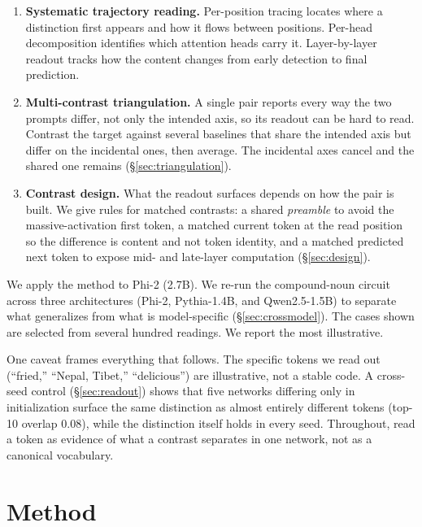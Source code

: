 \documentclass[11pt]{article}
\begin{document}
\begin{enumerate}[leftmargin=*]
\item \textbf{Systematic trajectory reading.} Per-position tracing locates where a
   distinction first appears and how it flows between positions. Per-head
   decomposition identifies which attention heads carry it. Layer-by-layer
   readout tracks how the content changes from early detection to final
   prediction.

\item \textbf{Multi-contrast triangulation.} A single pair reports every way the
   two prompts differ, not only the intended axis, so its readout can be hard
   to read. Contrast the target against several baselines that share the
   intended axis but differ on the incidental ones, then average. The
   incidental axes cancel and the shared one remains (\S\ref{sec:triangulation}).

\item \textbf{Contrast design.} What the readout surfaces depends on how the pair
   is built. We give rules for matched contrasts: a shared \emph{preamble} to
   avoid the massive-activation first token, a matched current token at the read
   position so the difference is content and not token identity, and a matched
   predicted next token to expose mid- and late-layer computation
   (\S\ref{sec:design}).
\end{enumerate}

We apply the method to Phi-2 (2.7B). We re-run the compound-noun circuit across
three architectures (Phi-2, Pythia-1.4B, and Qwen2.5-1.5B) to separate what
generalizes from what is model-specific (\S\ref{sec:crossmodel}). The cases
shown are selected from several hundred readings. We report the most
illustrative.

One caveat frames everything that follows. The specific tokens we read out
(``fried,'' ``Nepal, Tibet,'' ``delicious'') are illustrative, not a stable
code. A cross-seed control (\S\ref{sec:readout}) shows that five networks
differing only in initialization surface the same distinction as almost entirely
different tokens (top-10 overlap $0.08$), while the distinction itself holds in
every seed. Throughout, read a token as evidence of what a contrast separates in
one network, not as a canonical vocabulary.

\section{Method}
\end{document}
